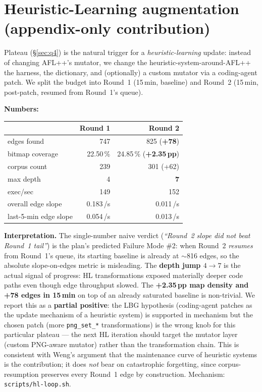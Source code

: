 \documentclass[letterpaper,twocolumn,10pt]{article}
\begin{document}
\section{Heuristic-Learning augmentation (appendix-only contribution)}
\label{sec:hl}
Plateau (§\ref{sec:q4}) is the natural trigger for a \emph{heuristic-learning}
update: instead of changing AFL++'s mutator, we change the
heuristic-system-around-AFL++ \textemdash{} the harness, the dictionary, and
(optionally) a custom mutator \textemdash{} via a coding-agent patch. We split
the budget into Round~1 (15\,min, baseline) and Round~2 (15\,min, post-patch,
resumed from Round~1's queue).

\textbf{Numbers:}
\begin{center}\small
\begin{tabular}{@{}lrr@{}}
\toprule
                          & Round 1 & Round 2\\
\midrule
edges found               & 747   & 825 (\textbf{+78})\\
bitmap coverage           & 22.50\,\%   & 24.85\,\% (\textbf{+2.35\,pp})\\
corpus count              & 239   & 301 (+62)\\
max depth                 & 4     & \textbf{7}\\
exec/sec                  & 149   & 152\\
overall edge slope        & 0.183\,/s & 0.011\,/s\\
last-5-min edge slope     & 0.054\,/s & 0.013\,/s\\
\bottomrule
\end{tabular}
\end{center}

\textbf{Interpretation.}
The single-number naive verdict (\textit{``Round~2 slope did not beat Round~1
tail''}) is the plan's predicted Failure Mode \#2: when Round~2 \emph{resumes}
from Round~1's queue, its starting baseline is already at $\sim$816 edges,
so the absolute slope-on-edges metric is misleading. The \textbf{depth jump
$4 \to 7$} is the actual signal of progress: HL transformations exposed
materially deeper code paths even though edge throughput slowed. The
\textbf{+2.35\,pp map density and +78 edges in 15\,min} on top of an already
saturated baseline is non-trivial. We report this as a \textbf{partial
positive}: the LBG hypothesis (coding-agent patches as the update mechanism
of a heuristic system) is supported in mechanism but the chosen patch
(more \texttt{png\_set\_*} transformations) is the wrong knob for this
particular plateau --- the next HL iteration should target the mutator
layer (custom PNG-aware mutator) rather than the transformation chain. This
is consistent with Weng's argument that the maintenance curve of heuristic
systems is the contribution; it does \emph{not} bear on catastrophic
forgetting, since corpus-resumption preserves every Round~1 edge by
construction. Mechanism: \texttt{scripts/hl-loop.sh}.
\end{document}
